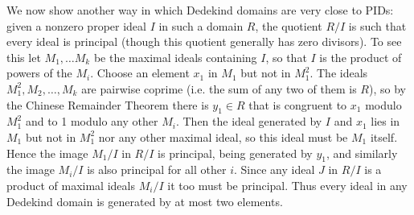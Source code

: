 \documentclass[10pt]{article}
\begin{document}
We now show another way in which Dedekind domains are very close to
PIDs: given a nonzero proper ideal $I$ in such a domain $R$, the
quotient $R/I$ is such that every ideal is principal (though this
quotient generally has zero divisors). To see this let $M_1,\ldots M_k$
be the maximal ideals containing $I$, so that $I$ is the product of
powers of the $M_i$. Choose an element $x_1$ in $M_1$ but not in
$M_1^2$. The ideals $M_1^2,M_2,\ldots,M_k$ are pairwise coprime (i.e.
the sum of any two of them is $R$), so by the Chinese Remainder Theorem
there is $y_1\in R$ that is congruent to $x_1$ modulo $M_1^2$ and to 1
modulo any other $M_i$. Then the ideal generated by $I$ and $x_1$ lies
in $M_1$ but not in $M_1^2$ nor any other maximal ideal, so this ideal
must be $M_1$ itself. Hence the image $M_1/I$ in $R/I$ is principal,
being generated by $y_1$, and similarly the image $M_i/I$ is also
principal for all other $i$. Since any ideal $J$ in $R/I$ is a product
of maximal ideals $M_i/I$ it too must be principal. Thus every ideal in
any Dedekind domain is generated by at most two elements.
\end{document}
